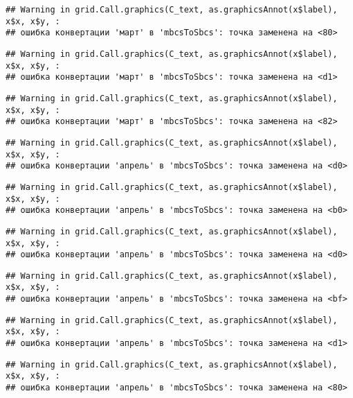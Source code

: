 \documentclass[
]{article}
\begin{document}
\begin{verbatim}
## Warning in grid.Call.graphics(C_text, as.graphicsAnnot(x$label), x$x, x$y, :
## ошибка конвертации 'март' в 'mbcsToSbcs': точка заменена на <80>
\end{verbatim}

\begin{verbatim}
## Warning in grid.Call.graphics(C_text, as.graphicsAnnot(x$label), x$x, x$y, :
## ошибка конвертации 'март' в 'mbcsToSbcs': точка заменена на <d1>
\end{verbatim}

\begin{verbatim}
## Warning in grid.Call.graphics(C_text, as.graphicsAnnot(x$label), x$x, x$y, :
## ошибка конвертации 'март' в 'mbcsToSbcs': точка заменена на <82>
\end{verbatim}

\begin{verbatim}
## Warning in grid.Call.graphics(C_text, as.graphicsAnnot(x$label), x$x, x$y, :
## ошибка конвертации 'апрель' в 'mbcsToSbcs': точка заменена на <d0>
\end{verbatim}

\begin{verbatim}
## Warning in grid.Call.graphics(C_text, as.graphicsAnnot(x$label), x$x, x$y, :
## ошибка конвертации 'апрель' в 'mbcsToSbcs': точка заменена на <b0>
\end{verbatim}

\begin{verbatim}
## Warning in grid.Call.graphics(C_text, as.graphicsAnnot(x$label), x$x, x$y, :
## ошибка конвертации 'апрель' в 'mbcsToSbcs': точка заменена на <d0>
\end{verbatim}

\begin{verbatim}
## Warning in grid.Call.graphics(C_text, as.graphicsAnnot(x$label), x$x, x$y, :
## ошибка конвертации 'апрель' в 'mbcsToSbcs': точка заменена на <bf>
\end{verbatim}

\begin{verbatim}
## Warning in grid.Call.graphics(C_text, as.graphicsAnnot(x$label), x$x, x$y, :
## ошибка конвертации 'апрель' в 'mbcsToSbcs': точка заменена на <d1>
\end{verbatim}

\begin{verbatim}
## Warning in grid.Call.graphics(C_text, as.graphicsAnnot(x$label), x$x, x$y, :
## ошибка конвертации 'апрель' в 'mbcsToSbcs': точка заменена на <80>
\end{verbatim}
\end{document}
